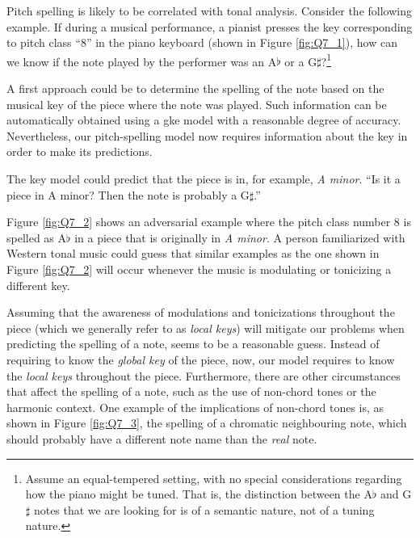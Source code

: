 

Pitch spelling is likely to be correlated with tonal
analysis. Consider the following example. If during a
musical performance, a pianist presses the key corresponding
to pitch class ``8'' in the piano keyboard (shown in Figure
\ref{fig:Q7_1}), how can we know if the note played by the
performer was an A$\flat$ or a G$\sharp$?\footnote{Assume an
equal-tempered setting, with no special considerations
regarding how the piano might be tuned. That is, the
distinction between the A$\flat$ and G$\sharp$ notes that we
are looking for is of a semantic nature, not of a tuning
nature.}


A first approach could be to determine the spelling of the
note based on the musical key of the piece where the note
was played. Such information can be automatically obtained
using a \gls{gke} model with a reasonable degree of
accuracy. Nevertheless, our pitch-spelling model now
requires information about the key in order to make its
predictions.

The key model could predict that the piece is in, for
example, \emph{A minor}. ``Is it a piece in A minor? Then
the note is probably a G$\sharp$.''


Figure \ref{fig:Q7_2} shows an adversarial example where the
pitch class number 8 is spelled as A$\flat$ in a piece that
is originally in \emph{A minor}. A person familiarized with
Western tonal music could guess that similar examples as the
one shown in Figure \ref{fig:Q7_2} will occur whenever the
music is modulating or tonicizing a different key.

Assuming that the awareness of modulations and tonicizations
throughout the piece (which we generally refer to as
\emph{local keys}) will mitigate our problems when
predicting the spelling of a note, seems to be a reasonable
guess. Instead of requiring to know the \emph{global key} of
the piece, now, our model requires to know the \emph{local
keys} throughout the piece. Furthermore, there are other
circumstances that affect the spelling of a note, such as
the use of non-chord tones or the harmonic context. One
example of the implications of non-chord tones is, as shown
in Figure \ref{fig:Q7_3}, the spelling of a chromatic
neighbouring note, which should probably have a different
note name than the \emph{real} note.

